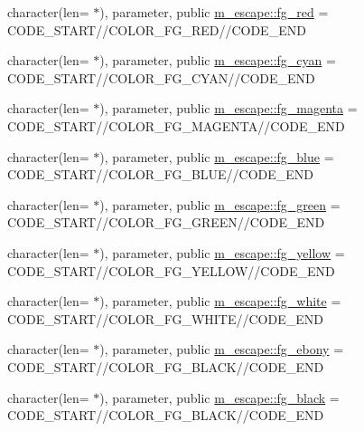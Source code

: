 \begin{DoxyCompactItemize}
\item 
character(len= $\ast$), parameter, public \mbox{\hyperlink{namespacem__escape_a615ac74b8d93904b5fb35fd656f18aa3}{m\+\_\+escape\+::fg\+\_\+red}} = C\+O\+D\+E\+\_\+\+S\+T\+A\+RT//C\+O\+L\+O\+R\+\_\+\+F\+G\+\_\+\+R\+ED//C\+O\+D\+E\+\_\+\+E\+ND
\item 
character(len= $\ast$), parameter, public \mbox{\hyperlink{namespacem__escape_abdd10ab49027c01752c5a165d42dca95}{m\+\_\+escape\+::fg\+\_\+cyan}} = C\+O\+D\+E\+\_\+\+S\+T\+A\+RT//C\+O\+L\+O\+R\+\_\+\+F\+G\+\_\+\+C\+Y\+AN//C\+O\+D\+E\+\_\+\+E\+ND
\item 
character(len= $\ast$), parameter, public \mbox{\hyperlink{namespacem__escape_a44464db3bf2f3277b04e505bf79061a4}{m\+\_\+escape\+::fg\+\_\+magenta}} = C\+O\+D\+E\+\_\+\+S\+T\+A\+RT//C\+O\+L\+O\+R\+\_\+\+F\+G\+\_\+\+M\+A\+G\+E\+N\+TA//C\+O\+D\+E\+\_\+\+E\+ND
\item 
character(len= $\ast$), parameter, public \mbox{\hyperlink{namespacem__escape_a94792b1429eb9880530d93643e9ce22c}{m\+\_\+escape\+::fg\+\_\+blue}} = C\+O\+D\+E\+\_\+\+S\+T\+A\+RT//C\+O\+L\+O\+R\+\_\+\+F\+G\+\_\+\+B\+L\+UE//C\+O\+D\+E\+\_\+\+E\+ND
\item 
character(len= $\ast$), parameter, public \mbox{\hyperlink{namespacem__escape_a1ada5ca3807f86e47be0b48c41e410c7}{m\+\_\+escape\+::fg\+\_\+green}} = C\+O\+D\+E\+\_\+\+S\+T\+A\+RT//C\+O\+L\+O\+R\+\_\+\+F\+G\+\_\+\+G\+R\+E\+EN//C\+O\+D\+E\+\_\+\+E\+ND
\item 
character(len= $\ast$), parameter, public \mbox{\hyperlink{namespacem__escape_a9902f29abc8261843e6b317cd07368ec}{m\+\_\+escape\+::fg\+\_\+yellow}} = C\+O\+D\+E\+\_\+\+S\+T\+A\+RT//C\+O\+L\+O\+R\+\_\+\+F\+G\+\_\+\+Y\+E\+L\+L\+OW//C\+O\+D\+E\+\_\+\+E\+ND
\item 
character(len= $\ast$), parameter, public \mbox{\hyperlink{namespacem__escape_adde79fd804c7dffee08721f5a360345c}{m\+\_\+escape\+::fg\+\_\+white}} = C\+O\+D\+E\+\_\+\+S\+T\+A\+RT//C\+O\+L\+O\+R\+\_\+\+F\+G\+\_\+\+W\+H\+I\+TE//C\+O\+D\+E\+\_\+\+E\+ND
\item 
character(len= $\ast$), parameter, public \mbox{\hyperlink{namespacem__escape_a7b93e25003e389c21833a5ca8605d2de}{m\+\_\+escape\+::fg\+\_\+ebony}} = C\+O\+D\+E\+\_\+\+S\+T\+A\+RT//C\+O\+L\+O\+R\+\_\+\+F\+G\+\_\+\+B\+L\+A\+CK//C\+O\+D\+E\+\_\+\+E\+ND
\item 
character(len= $\ast$), parameter, public \mbox{\hyperlink{namespacem__escape_af2f18b52e294d4b9f312369d9e29421b}{m\+\_\+escape\+::fg\+\_\+black}} = C\+O\+D\+E\+\_\+\+S\+T\+A\+RT//C\+O\+L\+O\+R\+\_\+\+F\+G\+\_\+\+B\+L\+A\+CK//C\+O\+D\+E\+\_\+\+E\+ND

\end{DoxyCompactItemize}
